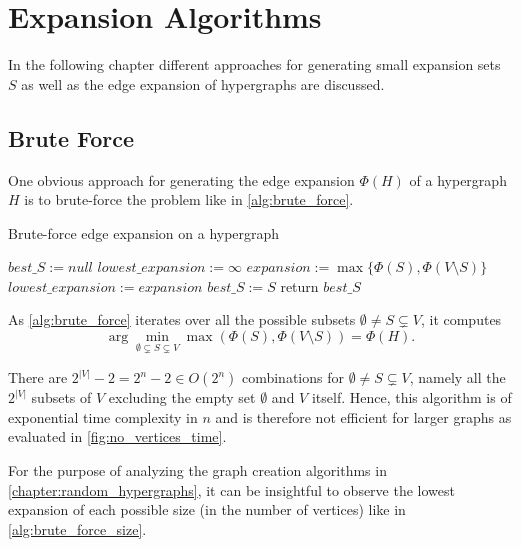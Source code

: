 \chapter{Expansion Algorithms}\label{chapter:algorithms}
In the following chapter different approaches for generating small expansion sets $S$ as well as the edge expansion of hypergraphs are discussed.



\section{Brute Force}
One obvious approach for generating the edge expansion $\Phi(H)$ of a hypergraph $H$ is to brute-force the problem like in \cref{alg:brute_force}.
\begin{algorithm}[H]
	\caption{Brute-force edge expansion on a hypergraph \label{alg:brute_force}}
	\begin{algorithmic}
		\State $best\_S := null$
		\State $lowest\_expansion := \infty$
		\State $expansion :=  \max\{ \Phi(S), \Phi({V\setminus S})\}$
			\State $lowest\_expansion := expansion$
			\State $best\_S := S$
		\EndIf
		\EndFor	
		\State return $best\_S$
		\EndFunction
	\end{algorithmic}
\end{algorithm}


As \cref{alg:brute_force} iterates over all the possible subsets $\emptyset \neq S \subsetneq V$, it computes \begin{equation}
\arg\min_{\emptyset \subsetneq S \subsetneq V} \max{( \Phi(S), \Phi({V\setminus S}))} = \Phi(H).
\end{equation}

There are $2^{|V|}-2 = 2^{n}-2 \in O(2^n) $ combinations for $\emptyset \neq S \subsetneq V$, namely all the $2^{|V|}$ subsets of $V$ excluding the empty set $\emptyset$ and $V$ itself. Hence, this algorithm is of exponential time complexity in $n$ and is therefore not efficient for larger graphs as evaluated in \cref{fig:no_vertices_time}.

For the purpose of analyzing the graph creation algorithms in \cref{chapter:random_hypergraphs}, it can be insightful to observe the lowest expansion of each possible size (in the number of vertices) like in \cref{alg:brute_force_size}.

